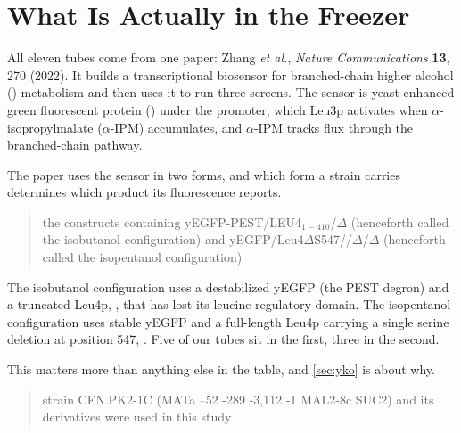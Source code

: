 
\section{What Is Actually in the Freezer}
\label{sec:panel}

All eleven tubes come from one paper: Zhang \textit{et al.}, \textit{Nature
Communications} \textbf{13}, 270 (2022). It builds a transcriptional biosensor
for branched-chain higher alcohol () metabolism and then uses it to
run three screens. The sensor is yeast-enhanced green fluorescent protein
() under the  promoter, which Leu3p activates when
$\alpha$-isopropylmalate ($\alpha$-IPM) accumulates, and $\alpha$-IPM tracks
flux through the branched-chain pathway.

 The paper
uses the sensor in two forms, and which form a strain carries determines which
product its fluorescence reports.

\begin{quote}\small
the constructs containing yEGFP-PEST/LEU4$_{1-410}$/$\Delta$
(henceforth called the isobutanol configuration) and
yEGFP/Leu4$\Delta$S547//$\Delta$/$\Delta$
(henceforth called the isopentanol configuration)
\end{quote}

\noindent
The isobutanol configuration uses a destabilized yEGFP (the PEST degron) and a
truncated Leu4p, , that has lost its leucine regulatory
domain. The isopentanol configuration uses stable yEGFP and a full-length Leu4p
carrying a single serine deletion at position 547,
. Five of our tubes sit in the first, three in the
second.

 This matters more than
anything else in the table, and \cref{sec:yko} is about why.

\begin{quote}\small
{} strain CEN.PK2-1C (MATa --52 -289
-3,112 -1 MAL2-8c SUC2) and its derivatives were used in
this study
\end{quote}

